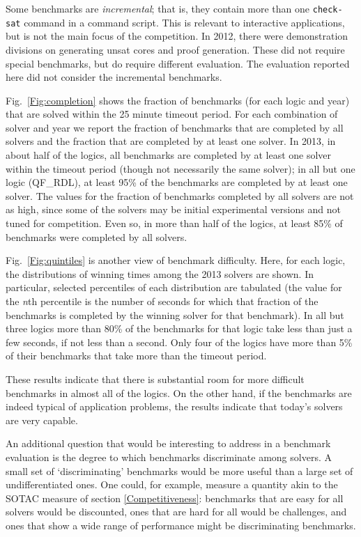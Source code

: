 \documentclass[smallcondensed]{svjour3}
\begin{document}
Some benchmarks are {\em incremental}; that is, they contain more than one {\tt check-sat} command in a command script. This is relevant to interactive applications, but is not the main focus of the competition. In 2012, there were demonstration divisions on generating unsat cores and proof generation. These did not require special benchmarks, but do require different evaluation. The evaluation reported here did not consider the incremental benchmarks.


Fig.~\ref{Fig:completion} shows the fraction of benchmarks (for each logic and year) that are solved within the 25 minute timeout period. For each combination of solver and year we report the fraction of benchmarks that are completed by all solvers and the fraction that are completed by at least one solver. In 2013, in about half of the logics, all benchmarks are completed by at least one solver within the timeout period (though not necessarily the same solver); in all but one logic (QF\_RDL), at least 95\% of the benchmarks are completed by at least one solver. The values for the fraction of benchmarks completed by all solvers are not as high, since some of the solvers may be initial experimental versions and not tuned for competition. Even so, in more than half of the logics, at least 85\% of benchmarks were completed by all solvers.

Fig.~\ref{Fig:quintiles} is another view of benchmark difficulty. Here, for each logic, the distributions of winning times among the 2013 solvers are shown. In particular, selected
percentiles of each distribution are tabulated (the value for the {\em n}th percentile is the number of seconds for which that fraction of the benchmarks is completed by the winning solver for that benchmark). In all but three logics more than 80\% of the benchmarks for that logic take less than just a few seconds, if not less than a second. Only four of the logics have more than 5\% of their benchmarks that take more than the timeout period.
 
These results indicate that there is substantial room for more difficult benchmarks in almost all of the logics. On the other hand, if the benchmarks are indeed typical of application problems, the results indicate that today's solvers are very capable.

An additional question that would be interesting to address in a benchmark evaluation
 is the degree to which benchmarks discriminate among solvers. A small set of `discriminating' benchmarks would be more useful than a large set of undifferentiated ones. One could, for example, measure a quantity akin to the SOTAC measure of section \ref{Competitiveness}: benchmarks that are easy for all solvers would be discounted, ones that are hard for all would be challenges, and ones that show a wide range of performance might be discriminating benchmarks.
\end{document}
